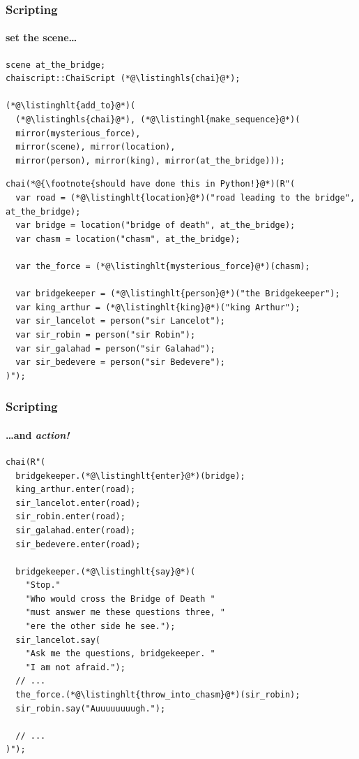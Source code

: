 \documentclass[aspectratio=169,compress,table,xcolor=table]{beamer}
\begin{document}
\begin{frame}[fragile]
  \frametitle{Scripting}
  \framesubtitle{set the scene\ldots}
  \begin{lstlisting}[language=c++2x,basicstyle=\scriptsize\ttfamily]
scene at_the_bridge;
chaiscript::ChaiScript (*@\listinghls{chai}@*);

(*@\listinghlt{add_to}@*)(
  (*@\listinghls{chai}@*), (*@\listinghl{make_sequence}@*)(
  mirror(mysterious_force),
  mirror(scene), mirror(location),
  mirror(person), mirror(king), mirror(at_the_bridge)));
  \end{lstlisting}
  \begin{lstlisting}[language=c++2x,basicstyle=\tiny\ttfamily]
chai(*@{\footnote{should have done this in Python!}@*)(R"(
  var road = (*@\listinghlt{location}@*)("road leading to the bridge", at_the_bridge);
  var bridge = location("bridge of death", at_the_bridge);
  var chasm = location("chasm", at_the_bridge);

  var the_force = (*@\listinghlt{mysterious_force}@*)(chasm);

  var bridgekeeper = (*@\listinghlt{person}@*)("the Bridgekeeper");
  var king_arthur = (*@\listinghlt{king}@*)("king Arthur");
  var sir_lancelot = person("sir Lancelot");
  var sir_robin = person("sir Robin");
  var sir_galahad = person("sir Galahad");
  var sir_bedevere = person("sir Bedevere");
)");
  \end{lstlisting}
\end{frame}
\begin{frame}[fragile]
  \frametitle{Scripting}
  \framesubtitle{\ldots and {\em \larger action!}}
  \begin{lstlisting}[language=c++2x,basicstyle=\scriptsize\ttfamily]
chai(R"(
  bridgekeeper.(*@\listinghlt{enter}@*)(bridge);
  king_arthur.enter(road);
  sir_lancelot.enter(road);
  sir_robin.enter(road);
  sir_galahad.enter(road);
  sir_bedevere.enter(road);

  bridgekeeper.(*@\listinghlt{say}@*)(
    "Stop."
    "Who would cross the Bridge of Death "
    "must answer me these questions three, "
    "ere the other side he see.");
  sir_lancelot.say(
    "Ask me the questions, bridgekeeper. "
    "I am not afraid.");
  // ...
  the_force.(*@\listinghlt{throw_into_chasm}@*)(sir_robin);
  sir_robin.say("Auuuuuuuugh.");

  // ...
)");
  \end{lstlisting}
\end{frame}
\end{document}

